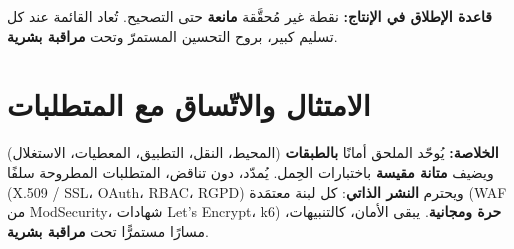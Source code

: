 \begin{encadre}
\textbf{قاعدة الإطلاق في الإنتاج:} نقطة غير مُحقَّقة \textbf{مانعة} حتى التصحيح.
تُعاد القائمة عند كل تسليم كبير، بروح التحسين المستمرّ وتحت \textbf{مراقبة بشرية}.
\end{encadre}

\section{الامتثال والاتّساق مع المتطلبات}
\begin{encadre}
\textbf{الخلاصة:} يُوحّد الملحق أمانًا \textbf{بالطبقات} (المحيط، النقل،
التطبيق، المعطيات، الاستغلال) ويضيف \textbf{متانة مقيسة} باختبارات الحِمل.
يُمدّد، دون تناقض، المتطلبات المطروحة سلفًا (X.509 / SSL، OAuth، RBAC، RGPD)
ويحترم \textbf{النشر الذاتي}: كل لبنة معتمَدة (WAF من ModSecurity، شهادات Let's
Encrypt، k6) \textbf{حرة ومجانية}. يبقى الأمان، كالتنبيهات، مسارًا مستمرًّا تحت
\textbf{مراقبة بشرية}.
\end{encadre}
